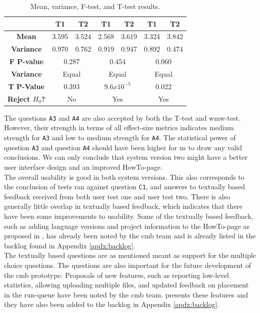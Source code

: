 \begin{table}[t!]
\begin{tabular}{|c||c|c||c|c||c|c||}
      &  T1 & T2 & T1 & T2 & T1 & T2 \\ \hline
      \textbf{Mean} & 3.595 & 3.524 & 2.568 & 3.619 & 3.324 & 3.842 \\ \hline
      \textbf{Variance} & 0.970 & 0.762 & 0.919 & 0.947 & 0.892 & 0.474 \\ \hline
      \textbf{F P-value} & \multicolumn{2}{c||}{0.287} & \multicolumn{2}{c||}{0.454} & \multicolumn{2}{c||}{0.060}\\ \hline
      \textbf{Variance} & \multicolumn{2}{c||}{Equal} & \multicolumn{2}{c||}{Equal} & \multicolumn{2}{c||}{Equal} \\ \hline
      \textbf{T P-Value} & \multicolumn{2}{c||}{0.393} & \multicolumn{2}{c||}{$9.6x10^{-5}$} & \multicolumn{2}{c||}{0.022} \\ \hline
      \textbf{Reject $H_0$?} & \multicolumn{2}{c||}{No} & \multicolumn{2}{c||}{Yes} & \multicolumn{2}{c||}{Yes} \\ \hline
    \end{tabular}
    \caption{Mean, variance, F-test, and T-test results.}
    \label{tab:results-tests-all}
\end{table}

The questions \texttt{A3} and \texttt{A4} are also accepted by both the T-test and \gls{wmw}-test. However, their strength in terms of all effect-size metrics indicates medium strength for \texttt{A3} and low to medium strength for \texttt{A4}. The statistical power of question \texttt{A3} and question \texttt{A4} should have been higher for us to draw any valid conclusions. We can only conclude that system version two might have a better user interface design and an improved HowTo-page. \\

The overall usability is good in both system versions. This also corresponds to the conclusion of tests ran against question  \texttt{C1}, and answers to textually based feedback received from both user test one and user test two. There is also generally little overlap in textually based feedback, which indicates that there have been some improvements to usability. Some of the textually based feedback, such as adding language versions and project information to the HowTo-page as proposed in , has already been noted by the \gls{cmb} team and is already listed in the backlog found in Appendix \ref{apdx:backlog}. \\

The textually based questions are as mentioned meant as support for the multiple choice questions. The questions are also important for the future development of the \gls{cmb} prototype. Proposals of new features, such as reporting low-level statistics, allowing uploading multiple files, and updated feedback on placement in the run-queue have been noted by the \gls{cmb} team.  presents these features and they have also been added to the backlog in Appendix \ref{apdx:backlog}. \\

